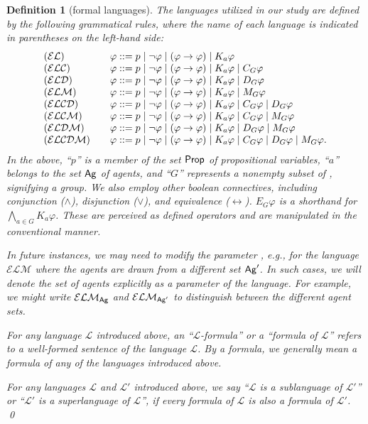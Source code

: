 \documentclass{article}
\newtheorem{definition}[theorem]{Definition}%
\newcommand{\ag}{\text{\normalfont\textsf{Ag}}\xspace}
\newcommand{\lra}{\leftrightarrow}
\renewcommand{\phi}{\varphi}
\newcommand{\prop}{\text{\normalfont\textsf{Prop}}\xspace}
\newcommand{\ra}{\rightarrow}
\newcommand{\lang}{\ensuremath{\mathcal{EL}}\xspace}
\newcommand{\langc}{\ensuremath{\mathcal{ELC}}\xspace}
\newcommand{\langd}{\ensuremath{\mathcal{ELD}}\xspace}
\newcommand{\langm}{\ensuremath{\mathcal{ELM}}\xspace}
\newcommand{\langcd}{\ensuremath{\mathcal{ELCD}}\xspace}
\newcommand{\langcm}{\ensuremath{\mathcal{ELCM}}\xspace}
\newcommand{\langdm}{\ensuremath{\mathcal{ELDM}}\xspace}
\newcommand{\langcdm}{\ensuremath{\mathcal{ELCDM}}\xspace}
\newcommand{\langl}{\ensuremath{\mathcal{L}}\xspace}
\begin{document}
\begin{definition}[formal languages]
The languages utilized in our study are defined by the following grammatical rules, where the name of each language is indicated in parentheses on the left-hand side:
$$\begin{array}{l@{\qquad}l}
(\lang)&\phi ::= p \mid \neg \phi \mid (\phi \ra \phi) \mid K_a\phi\\
(\langc)&\phi ::= p \mid \neg \phi \mid (\phi \ra \phi) \mid K_a\phi \mid C_G\phi\\
(\langd)&\phi ::= p \mid \neg \phi \mid (\phi \ra \phi) \mid K_a\phi \mid D_G\phi\\
(\langm)&\phi ::= p \mid \neg \phi \mid (\phi \ra \phi) \mid K_a\phi \mid M_G\phi\\
(\langcd)&\phi ::= p \mid \neg \phi \mid (\phi \ra \phi) \mid K_a\phi \mid C_G\phi \mid D_G\phi \\
(\langcm)&\phi ::= p \mid \neg \phi \mid (\phi \ra \phi) \mid K_a\phi \mid C_G\phi \mid M_G\phi \\
(\langdm)&\phi ::= p \mid \neg \phi \mid (\phi \ra \phi) \mid K_a\phi \mid D_G\phi \mid M_G\phi \\
(\langcdm)&\phi ::= p \mid \neg \phi \mid (\phi \ra \phi) \mid K_a\phi \mid C_G\phi \mid D_G\phi \mid M_G\phi.\\
\end{array}$$
In the above, ``$p$'' is a member of the set $\prop$ of propositional variables, ``$a$'' belongs to the set $\ag$ of agents, and ``$G$'' represents a nonempty subset of \ag, signifying a group. We also employ other boolean connectives, including conjunction ($\wedge$), disjunction ($\vee$), and equivalence ($\lra$). $E_G \phi$ is a shorthand for $\bigwedge_{a\in G} K_a\phi$. These are perceived as defined operators and are manipulated in the conventional manner.

In future instances, we may need to modify the parameter \ag, e.g., for the language \langm where the agents are drawn from a different set $\ag'$. In such cases, we will denote the set of agents explicitly as a parameter of the language. For example, we might write $\langm_{\ag}$ and $\langm_{\ag'}$ to distinguish between the different agent sets.

For any language \langl introduced above, an ``\emph{\langl-formula}'' or a ``\emph{formula of \langl}'' refers to a well-formed sentence of the language \langl. By a \emph{formula}, we generally mean a formula of any of the languages introduced above.

For any languages \langl and $\langl'$ introduced above, we say ``\langl is a \emph{sublanguage} of $\langl'$'' or ``$\langl'$ is a \emph{superlanguage} of \langl'', if every formula of \langl is also a formula of $\langl'$.
\qed
\end{definition}
\end{document}
